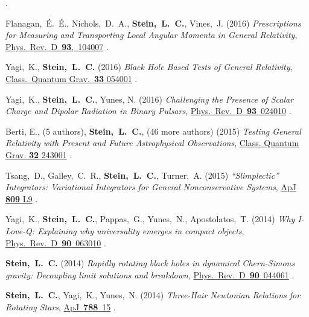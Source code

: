 \begin{etaremune}[start=\value{pubCounter}]
  .
\item
  Flanagan,~\'E.~\'E., Nichols,~D.~A., {\bf Stein,~L.~C.}, Vines,~J.
  (2016)
  {\it Prescriptions for Measuring and Transporting Local Angular
    Momenta in General Relativity},
  \href{http://dx.doi.org/10.1103/PhysRevD.93.104007}{Phys.~Rev.~D~{\bf 93},~104007}
  .
\item
  Yagi,~K., {\bf Stein,~L.~C.}
  (2016)
  {\it Black Hole Based Tests of General Relativity},
  \href{http://dx.doi.org/10.1088/0264-9381/33/5/054001}{Class.~Quantum Grav.~{\bf 33} 054001}
  .
\item
  Yagi,~K., {\bf Stein,~L.~C.}, Yunes, N.
  (2016)
  {\it Challenging the Presence of Scalar Charge and Dipolar Radiation
    in Binary Pulsars},
  \href{http://dx.doi.org/doi:10.1103/PhysRevD.93.024010}{Phys.~Rev.~D~{\bf 93}~024010}
  .
\item
  Berti, E., (5 authors), {\bf Stein,~L.~C.}, (46 more authors)
  (2015)
  {\it Testing General Relativity with Present and Future
    Astrophysical Observations},
  \href{http://dx.doi.org/10.1088/0264-9381/32/24/243001}{Class. Quantum Grav. {\bf 32} 243001}
  .
\item
  Tsang,~D., Galley,~C.~R., {\bf Stein,~L.~C.}, Turner,~A.
  (2015)
  {\it ``Slimplectic'' Integrators: Variational Integrators for General Nonconservative Systems},
  \href{http://dx.doi.org/10.1088/2041-8205/809/1/L9}{ApJ {\bf 809} L9}
  .
\item
  Yagi,~K., {\bf Stein,~L.~C.}, Pappas,~G., Yunes,~N., Apostolatos,~T.
  (2014)
  {\it Why I-Love-Q: Explaining why universality emerges in compact objects},
  \href{http://dx.doi.org/10.1103/PhysRevD.90.063010}{Phys.~Rev.~D~{\bf 90}~063010}
  .
\item
  {\bf Stein,~L.~C.}
  (2014)
  {\it Rapidly rotating black holes in dynamical Chern-Simons gravity:
    Decoupling limit solutions and breakdown},
  \href{http://dx.doi.org/10.1103/PhysRevD.90.044061}{Phys.~Rev.~D~{\bf 90}~044061}
  .
\item
  {\bf Stein,~L.~C.}, Yagi,~K., Yunes,~N.
  (2014)
  {\it Three-Hair Newtonian Relations for Rotating Stars},
  \href{http://dx.doi.org/10.1088/0004-637X/788/1/15}{ApJ~{\bf 788}~15}
  .
\item

\end{etaremune}

